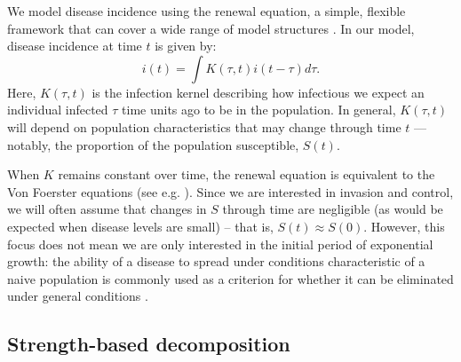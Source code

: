 \documentclass[12pt]{article}
\begin{document}
We model disease incidence using the renewal equation, a simple, flexible framework that can cover a wide range of model structures \citep{heesterbeek1996concept, diekmann2000mathematical, roberts2004modelling, aldis2005integral, wallinga2007generation, roberts2007model, Champredon2018equivalence}.
In our model, disease incidence at time $t$ is given by:
\begin{equation}
i(t) = \int K(\tau, t) i(t-\tau) d\tau.
\end{equation}
Here, $K(\tau, t)$ is the infection kernel describing how infectious we expect an individual infected $\tau$ time units ago to be in the population.
In general, $K(\tau, t)$ will depend on population characteristics that may change through time $t$ --- notably, the proportion of the population susceptible, $S(t)$.

When $K$ remains constant over time, the renewal equation is equivalent to the Von Foerster equations (see e.g. \cite{fraser2004factors}).
Since we are interested in invasion and control, we will often assume that changes in $S$ through time are negligible (as would be expected when disease levels are small) -- that is, $S(t) \approx S(0)$.
However, this focus does not mean we are only interested in the initial period of exponential growth: the ability of a disease to spread under conditions characteristic of a naive population is commonly used as a criterion for whether it can be eliminated under general conditions \citep{anderson1985vaccination,fraser2004factors}.

\subsection{Strength-based decomposition}
\end{document}
